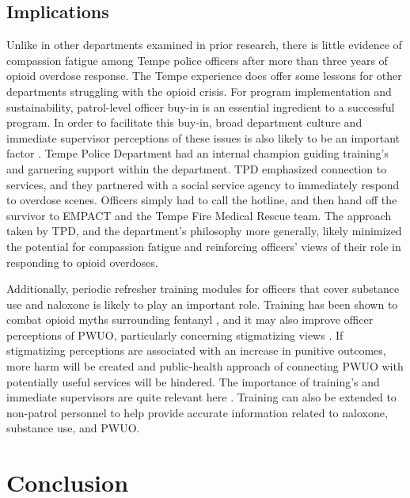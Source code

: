 \subsection{Implications}
Unlike in other departments examined in prior research, there is little evidence of compassion fatigue among Tempe police officers after more than three years of opioid overdose response. The Tempe experience does offer some lessons for other departments struggling with the opioid crisis. For program implementation and sustainability, patrol-level officer buy-in is an essential ingredient to a successful program. In order to facilitate this buy-in, broad department culture and immediate supervisor perceptions of these issues is also likely to be an important factor \parencite{del_pozo_police_2024}. Tempe Police Department had an internal champion guiding training's and garnering support within the department. TPD emphasized connection to services, and they partnered with a social service agency to immediately respond to overdose scenes. Officers simply had to call the hotline, and then hand off the survivor to EMPACT and the Tempe Fire Medical Rescue team. The approach taken by TPD, and the department’s philosophy more generally, likely minimized the potential for compassion fatigue and reinforcing officers’ views of their role in responding to opioid overdoses.

Additionally, periodic refresher training modules for officers that cover substance use and naloxone is likely to play an important role. Training has been shown to combat opioid myths surrounding fentanyl \parencite{del_pozo_can_2021}, and it may also improve officer perceptions of PWUO, particularly concerning stigmatizing views \parencite{winograd_concerns_2019}. If stigmatizing perceptions are associated with an increase in punitive outcomes, more harm will be created \parencite{binswanger_clinical_2016, ray_spatiotemporal_2023} and public-health approach of connecting PWUO with potentially useful services will be hindered. The importance of training's and immediate supervisors are quite relevant here \parencite{del_pozo_police_2024}. Training can also be extended to non-patrol personnel to help provide accurate information related to naloxone, substance use, and PWUO. 

\section{\centering Conclusion}

